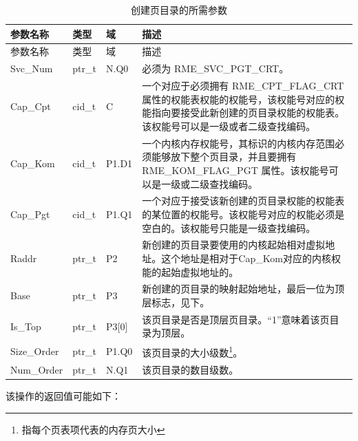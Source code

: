 \begin{xltabular}{\textwidth}{@{}>{\hsize\raggedright\arraybackslash}X>{\hsize\raggedright\arraybackslash}X>{\hsize\raggedright\arraybackslash}X>{\hsize\raggedright\arraybackslash}X@{}}
\caption{创建页目录的所需参数}\label{tab:3-10-create-page-directory-parameters}\\
\toprule
参数名称 & 类型 & 域 & 描述\tabularnewline
\endfirsthead
\toprule
参数名称 & 类型 & 域 & 描述\tabularnewline
\midrule
\endhead
\bottomrule
\endlastfoot
Svc\_Num & ptr\_t & N.Q0 & 必须为 RME\_SVC\_PGT\_CRT。\tabularnewline
Cap\_Cpt & cid\_t & C &
一个对应于必须拥有 RME\_CPT\_FLAG\_CRT 属性的权能表权能的权能号，该权能号对应的权能指向要接受此新创建的页目录权能的权能表。该权能号可以是一级或者二级查找编码。\tabularnewline
Cap\_Kom & cid\_t & P1.D1 &
一个内核内存权能号，其标识的内核内存范围必须能够放下整个页目录，并且要拥有 RME\_KOM\_FLAG\_PGT 属性。该权能号可以是一级或二级查找编码。\tabularnewline
Cap\_Pgt & cid\_t & P1.Q1 &
一个对应于接受该新创建的页目录权能的权能表的某位置的权能号。该权能号对应的权能必须是空白的。该权能号只能是一级查找编码。\tabularnewline
Raddr & ptr\_t & P2 &
新创建的页目录要使用的内核起始相对虚拟地址。这个地址是相对于Cap\_Kom对应的内核权能的起始虚拟地址的。\tabularnewline
Base & ptr\_t & P3 &
新创建的页目录的映射起始地址，最后一位为顶层标志，见下。\tabularnewline
Is\_Top & ptr\_t & P3{[}0{]} &
该页目录是否是顶层页目录。``1''意味着该页目录为顶层。\tabularnewline
Size\_Order & ptr\_t & P1.Q0 &
该页目录的大小级数\footnote{指每个页表项代表的内存页大小}。\tabularnewline
Num\_Order & ptr\_t & N.Q1 & 该页目录的数目级数。\tabularnewline
\end{xltabular}

该操作的返回值可能如下：


